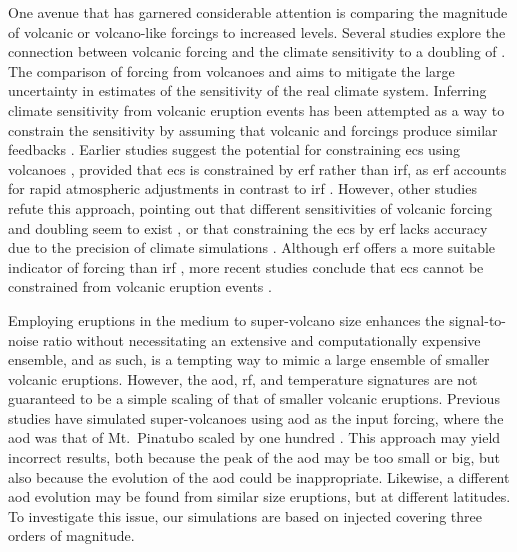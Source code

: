 \documentclass{ametsocV6.1}
\newcommand{\iso}[1][i]{{#1}njected \ce{SO2}}
\begin{document}
One avenue that has garnered considerable attention is comparing the magnitude of
volcanic or volcano-like forcings to increased  levels. Several studies explore
the connection between volcanic forcing and the climate sensitivity to a doubling of
\citep{boer2007,marvel2016,merlis2014,ollila2016,richardson2019,salvi2022,wigley2005}.
The comparison of forcing from volcanoes and  aims to mitigate the large
uncertainty in estimates of the sensitivity of the real climate system. Inferring
climate sensitivity from volcanic eruption events has been attempted as a way to
constrain the sensitivity \citep{boer2007} by assuming that volcanic and 
forcings produce similar feedbacks \citep{pauling2023}. Earlier studies suggest the
potential for constraining \gls{ecs} using volcanoes \citep{bender2010}, provided that
\gls{ecs} is constrained by \gls{erf} rather than \gls{irf}, as \gls{erf} accounts for
rapid atmospheric adjustments in contrast to \gls{irf} \citep{richardson2019}. However,
other studies refute this approach, pointing out that different sensitivities of
volcanic forcing and  doubling seem to exist \citep{douglass2006}, or that
constraining the \gls{ecs} by \gls{erf} lacks accuracy due to the precision of climate
simulations \citep{boer2007,salvi2022}. Although \gls{erf} offers a more suitable
indicator of forcing than \gls{irf} \citep{marvel2016,richardson2019}, more recent
studies conclude that \gls{ecs} cannot be constrained from volcanic eruption events
\citep{pauling2023}.

Employing eruptions in the medium to super-volcano size enhances the signal-to-noise
ratio without necessitating an extensive and computationally expensive ensemble, and as
such, is a tempting way to mimic a large ensemble of smaller volcanic eruptions.
However, the \gls{aod}, \gls{rf}, and temperature signatures are not guaranteed to be a
simple scaling of that of smaller volcanic eruptions. Previous studies have simulated
super-volcanoes using \gls{aod} as the input forcing, where the \gls{aod} was that of
Mt.\ Pinatubo scaled by one hundred \citep{jones2005}. This approach may yield incorrect
results, both because the peak of the \gls{aod} may be too small or big, but also
because the evolution of the \gls{aod} could be inappropriate. Likewise, a different
\gls{aod} evolution may be found from similar size eruptions, but at different
latitudes. To investigate this issue, our simulations are based on \iso{} covering three
orders of magnitude.
\end{document}
